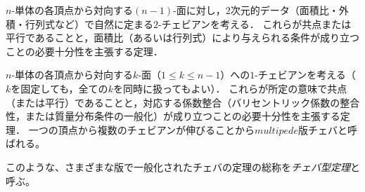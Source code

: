 \documentclass[a4paper,12pt]{bxjsbook}
\newlength{\customindent}
\newenvironment{body}{
  \par
  \begingroup
  \setlength{\leftskip}{\customindent}
  \setlength{\rightskip}{0pt}
  \setlength{\parindent}{1em}
  \setlength{\displayindent}{\customindent}
  \setlength{\displaywidth}{\dimexpr\linewidth-\customindent\relax}
}{
  \par
  \endgroup
}
\theoremstyle{theorem}
\begin{document}
\begin{body}
\begin{bodydescription}
            \item[\hspace*{1.5em}・候補C：$n$-単体版, 2-チェビアン]
            $n$-単体の各頂点から対向する$(n-1)$-面に対し，$2$次元的データ（面積比・外積・行列式など）で自然に定まる$2$-チェビアンを考える．
            これらが共点または平行であることと，面積比（あるいは行列式）により与えられる条件が成り立つことの必要十分性を主張する定理．
            
            \item[\hspace*{1.5em}・候補D：$n$単体版, multipede]\cite{multipede}
            $n$-単体の各頂点から対向する$k$-面（$1 \leq k \leq n-1$）への$1$-チェビアンを考える（$k$を固定しても，全ての$k$を同時に扱ってもよい）．
            これらが所定の意味で共点（または平行）であることと，対応する係数整合（バリセントリック係数の整合性，または質量分布条件の一般化）が成り立つことの必要十分性を主張する定理．
            一つの頂点から複数のチェビアンが伸びることから$multipede$版チェバと呼ばれる。
                
        \end{bodydescription}

        \indent このような、さまざまな版で一般化されたチェバの定理の総称を\emph{チェバ型定理}と呼ぶ。
    \end{body}
\end{document}
